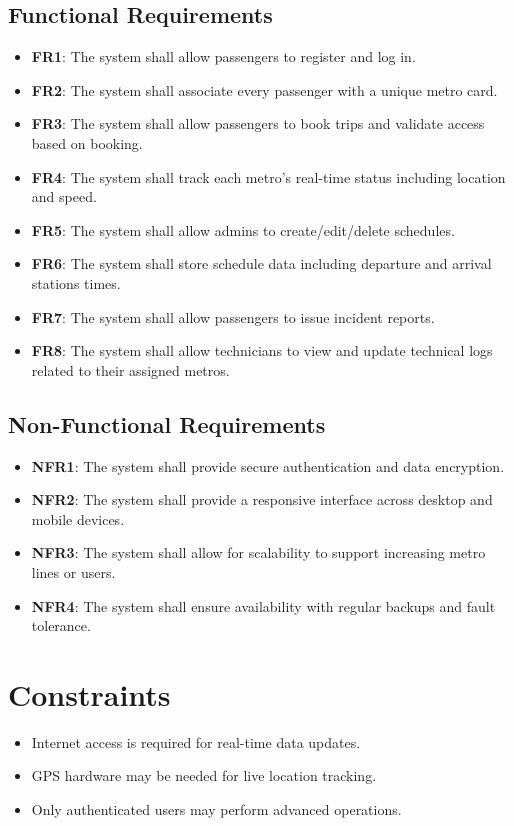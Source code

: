 \documentclass[12pt]{article}
\begin{document}
\subsection{Functional Requirements}
\begin{itemize}[noitemsep]
  \item \textbf{FR1}: The system shall allow passengers to register and log in.
  \item \textbf{FR2}: The system shall associate every passenger with a unique metro card.
  \item \textbf{FR3}: The system shall allow passengers to book trips and validate access based on booking.
  \item \textbf{FR4}: The system shall track each metro’s real-time status including location and speed.
  \item \textbf{FR5}: The system shall allow admins to create/edit/delete schedules.
  \item \textbf{FR6}: The system shall store schedule data including departure and arrival stations times.
  \item \textbf{FR7}: The system shall allow passengers to issue incident reports.
  \item \textbf{FR8}: The system shall allow technicians to view and update technical logs related to their assigned metros.
\end{itemize}

\subsection{Non-Functional Requirements}
\begin{itemize}[noitemsep]
  \item \textbf{NFR1}: The system shall provide secure authentication and data encryption.
  \item \textbf{NFR2}: The system shall provide a responsive interface across desktop and mobile devices.
  \item \textbf{NFR3}: The system shall allow for scalability to support increasing metro lines or users.
  \item \textbf{NFR4}: The system shall ensure availability with regular backups and fault tolerance.
\end{itemize}

\section{Constraints}
\begin{itemize}[noitemsep]
  \item Internet access is required for real-time data updates.
  \item GPS hardware may be needed for live location tracking.
  \item Only authenticated users may perform advanced operations.
\end{itemize}
\end{document}
